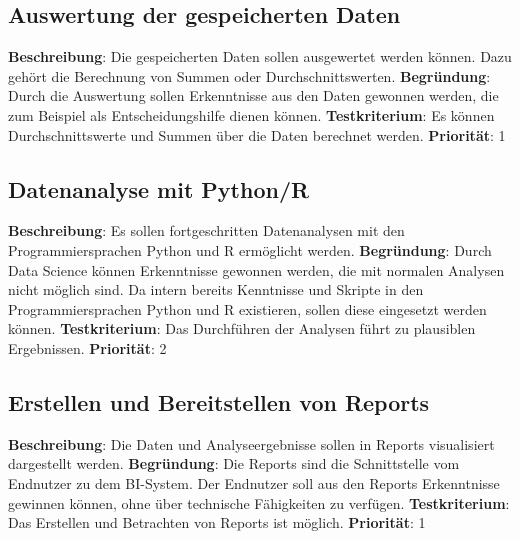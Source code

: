 \subsection{Auswertung der gespeicherten Daten} \label{sec:anforderungsspezifikation:datenAuswertung}
\textbf{Beschreibung}: Die gespeicherten Daten sollen ausgewertet werden können. Dazu gehört die Berechnung von Summen oder Durchschnittswerten.
\newline \textbf{Begründung}: Durch die Auswertung sollen Erkenntnisse aus den Daten gewonnen werden, die zum Beispiel als Entscheidungshilfe dienen können.
\newline \textbf{Testkriterium}: Es können Durchschnittswerte und Summen über die Daten berechnet werden.
\newline \textbf{Priorität}: 1

\subsection{Datenanalyse mit Python/R} \label{sec:anforderungsspezifikation:datenanalysePythonUndR}
\textbf{Beschreibung}: Es sollen fortgeschritten Datenanalysen mit den Programmiersprachen Python und R ermöglicht werden. 
\newline \textbf{Begründung}: Durch Data Science können Erkenntnisse gewonnen werden, die mit normalen Analysen nicht möglich sind. Da intern bereits Kenntnisse und Skripte in den Programmiersprachen Python und R existieren, sollen diese eingesetzt werden können.
\newline \textbf{Testkriterium}: Das Durchführen der Analysen führt zu plausiblen Ergebnissen.
\newline \textbf{Priorität}: 2

\subsection{Erstellen und Bereitstellen von Reports} \label{sec:anforderungsspezifikation:reports}
\textbf{Beschreibung}: Die Daten und Analyseergebnisse sollen in Reports visualisiert dargestellt werden.
\newline \textbf{Begründung}: Die Reports sind die Schnittstelle vom Endnutzer zu dem BI-System. Der Endnutzer soll aus den Reports Erkenntnisse gewinnen können, ohne über technische Fähigkeiten zu verfügen.
\newline \textbf{Testkriterium}: Das Erstellen und Betrachten von Reports ist möglich.
\newline \textbf{Priorität}: 1

